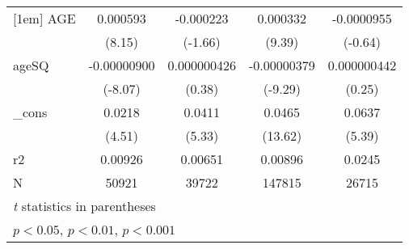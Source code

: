 \begin{table}[htbp]
\begin{tabular}{l*{4}{c}}
[1em]
AGE         &    0.000593\sym{***}&   -0.000223         &    0.000332\sym{***}&  -0.0000955         \\
            &      (8.15)         &     (-1.66)         &      (9.39)         &     (-0.64)         \\
[1em]
ageSQ       & -0.00000900\sym{***}& 0.000000426         & -0.00000379\sym{***}& 0.000000442         \\
            &     (-8.07)         &      (0.38)         &     (-9.29)         &      (0.25)         \\
[1em]
\_cons      &      0.0218\sym{***}&      0.0411\sym{***}&      0.0465\sym{***}&      0.0637\sym{***}\\
            &      (4.51)         &      (5.33)         &     (13.62)         &      (5.39)         \\
\hline
r2          &     0.00926         &     0.00651         &     0.00896         &      0.0245         \\
N           &       50921         &       39722         &      147815         &       26715         \\
\hline\hline
\multicolumn{5}{l}{\footnotesize \textit{t} statistics in parentheses}\\
\multicolumn{5}{l}{\footnotesize \sym{*} \(p<0.05\), \sym{**} \(p<0.01\), \sym{***} \(p<0.001\)}\\
\end{tabular}
\end{table}
